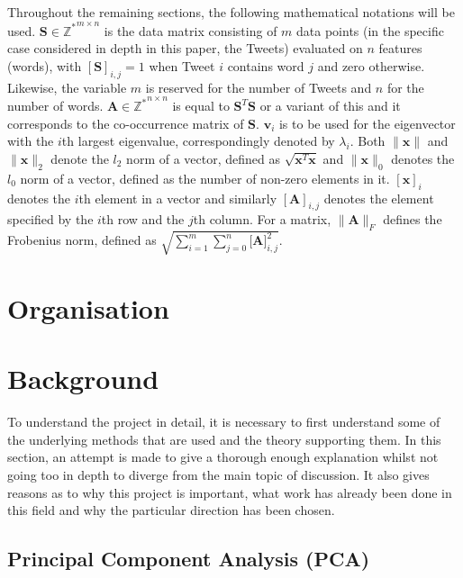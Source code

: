 \documentclass[11pt,a4paper]{article}
\begin{document}
Throughout the remaining sections, the following mathematical notations will be used. $\mathbf{S} \in \mathbb{Z^*}^{m\times n}$ is the data matrix consisting of $m$ data points (in the specific case considered in depth in this paper, the Tweets) evaluated on $n$ features (words), with $[\mathbf{S}]_{i,j} = 1$ when Tweet $i$ contains word $j$ and zero otherwise. Likewise, the variable $m$ is reserved for the number of Tweets and $n$ for the number of words. $\mathbf{A} \in \mathbb{Z^*}^{n \times n}$ is equal to $\mathbf{S}^T\mathbf{S}$ or a variant of this and it corresponds to the co-occurrence matrix of $\mathbf{S}$. $\mathbf{v}_i$ is to be used for the eigenvector with the $i$th largest eigenvalue, correspondingly denoted by $\lambda_i$. Both $\|\mathbf{x}\|$ and $\|\mathbf{x}\|_2$ denote the $l_2$ norm of a vector, defined as $\sqrt{\mathbf{x}^T\mathbf{x}}$ and $\|\mathbf{x}\|_0$ denotes the $l_0$ norm of a vector, defined as the number of non-zero elements in it. $[\mathbf{x} ]_i$ denotes the $i$th element in a vector and similarly $[\mathbf{A}]_{i, j}$ denotes the element specified by the $i$th row and the $j$th column. For a matrix, $\|\mathbf{A}\|_F$ defines the Frobenius norm, defined as $\sqrt{\sum^m_{i=1}{\sum_{j=0}^n{\mathbf{[A}]_{i, j}^2}}}$.

\section{Organisation}
\section{Background}
To understand the project in detail, it is necessary to first understand some of the underlying methods that are used and the theory supporting them. In this section, an attempt is made to give a thorough enough explanation whilst not going too in depth to diverge from the main topic of discussion. It also gives reasons as to why this project is important, what work has already been done in this field and why the particular direction has been chosen. 




\subsection{Principal Component Analysis (PCA)}
\end{document}

